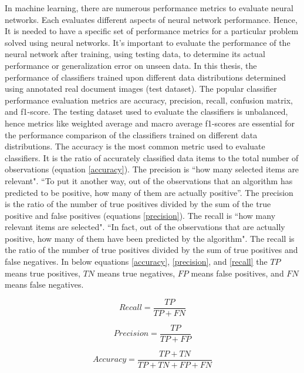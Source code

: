 In machine learning, there are numerous performance metrics to evaluate neural networks. Each evaluates different aspects of neural network performance. Hence, It is needed to have a specific set of performance metrics for a particular problem solved using neural networks. It's important to evaluate the performance of the neural network after training, using testing data, to determine its actual performance or generalization error on unseen data. In this thesis, the performance of classifiers trained upon different data distributions determined using annotated real document images (test dataset). The popular classifier performance evaluation metrics are accuracy, precision, recall, confusion matrix, and f1-score\cite{powers2020evaluation}. The testing dataset used to evaluate the classifiers is unbalanced, hence metrics like weighted average and macro average f1-scores are essential for the performance comparison of the classifiers trained on different data distributions. The accuracy is the most common metric used to evaluate classifiers. It is the ratio of accurately classified data items to the total number of observations (equation \ref{accuracy}). The precision is ``how many selected items are relevant". ``To put it another way, out of the observations that an algorithm has predicted to be positive, how many of them are actually positive''\cite{vakili2020performance}. The precision is the ratio of the number of true positives divided by the sum of the true positive and false positives (equations \ref{precision}). The recall is ``how many relevant items are selected". ``In fact, out of the observations that are actually positive, how many of them have been predicted by the algorithm"\cite{vakili2020performance}. The recall is the ratio of the number of true positives divided by the sum of true positives and false negatives. In below equations \ref{accuracy}, \ref{precision}, and \ref{recall} the $TP$ means true positives, $TN$ means true negatives, $FP$ means false positives, and $FN$ means false negatives.



\begin{equation}\label{recall}
\textit{Recall} = \frac{TP}{TP + FN}
\end{equation}

\begin{equation}\label{precision}
\textit{Precision} = \frac{TP}{TP + FP}
\end{equation}


\begin{equation}\label{accuracy}
\textit{Accuracy} = \frac{TP + TN}{TP +TN+ FP + FN}
\end{equation}

